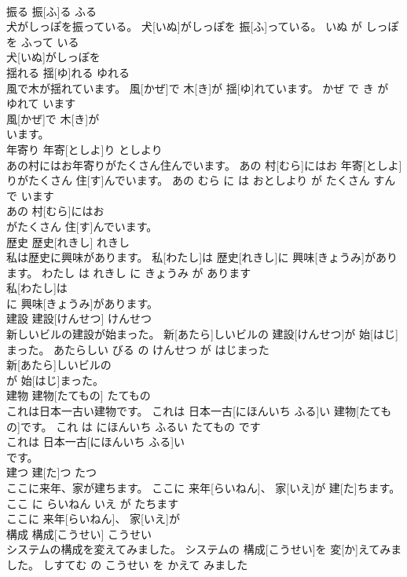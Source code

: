 \documentclass[8pt]{extreport}
\begin{document}
\begin{CJK}{UTF8}{min}
\\	振る	振[ふ]る	ふる	
\\	犬がしっぽを振っている。	犬[いぬ]がしっぽを 振[ふ]っている。	いぬ が しっぽ を ふって いる	
\\	犬[いぬ]がしっぽを
\\	揺れる	揺[ゆ]れる	ゆれる	
\\	風で木が揺れています。	風[かぜ]で 木[き]が 揺[ゆ]れています。	かぜ で き が ゆれて います	
\\	風[かぜ]で 木[き]が
\\	います。			
\\	年寄り	年寄[としよ]り	としより	
\\	あの村にはお年寄りがたくさん住んでいます。	あの 村[むら]にはお 年寄[としよ]りがたくさん 住[す]んでいます。	あの むら に は おとしより が たくさん すんで います	
\\	あの 村[むら]にはお
\\	がたくさん 住[す]んでいます。			
\\	歴史	歴史[れきし]	れきし	
\\	私は歴史に興味があります。	私[わたし]は 歴史[れきし]に 興味[きょうみ]があります。	わたし は れきし に きょうみ が あります	
\\	私[わたし]は
\\	に 興味[きょうみ]があります。			
\\	建設	建設[けんせつ]	けんせつ	
\\	新しいビルの建設が始まった。	新[あたら]しいビルの 建設[けんせつ]が 始[はじ]まった。	あたらしい びる の けんせつ が はじまった	
\\	新[あたら]しいビルの
\\	が 始[はじ]まった。			
\\	建物	建物[たてもの]	たてもの	
\\	これは日本一古い建物です。	これは 日本一古[にほんいち ふる]い 建物[たてもの]です。	これ は にほんいち ふるい たてもの です	
\\	これは 日本一古[にほんいち ふる]い
\\	です。			
\\	建つ	建[た]つ	たつ	
\\	ここに来年、家が建ちます。	ここに 来年[らいねん]、 家[いえ]が 建[た]ちます。	ここ に らいねん いえ が たちます	
\\	ここに 来年[らいねん]、 家[いえ]が
\\	構成	構成[こうせい]	こうせい	
\\	システムの構成を変えてみました。	システムの 構成[こうせい]を 変[か]えてみました。	しすてむ の こうせい を かえて みました	

\end{CJK}
\end{document}
